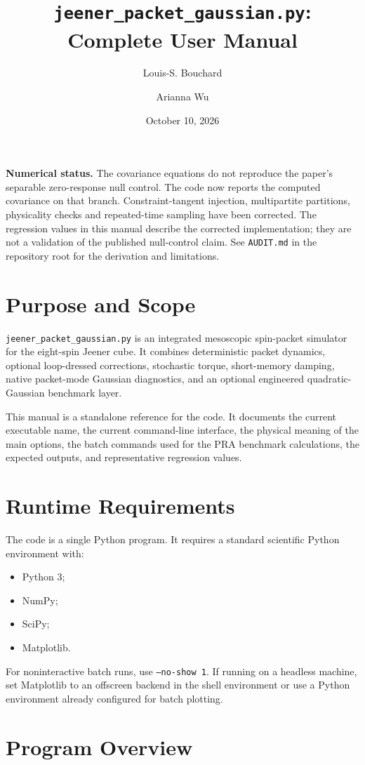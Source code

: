\documentclass[11pt]{article}
\title{\texttt{jeener\_packet\_gaussian.py}: Complete User Manual}
\author{Louis-S. Bouchard \and Arianna Wu}
\date{October 10, 2026}
\begin{document}
\maketitle
\noindent\textbf{Numerical status.} The covariance equations do not reproduce
the paper's separable zero-response null control. The code now reports the
computed covariance on that branch. Constraint-tangent injection, multipartite
partitions, physicality checks and repeated-time sampling have been corrected.
The regression values in this manual describe the corrected implementation;
they are not a validation of the published null-control claim. See
\texttt{AUDIT.md} in the repository root for the derivation and limitations.
\tableofcontents

\section{Purpose and Scope}
\texttt{jeener\_packet\_gaussian.py} is an integrated mesoscopic spin-packet
simulator for the eight-spin Jeener cube. It combines deterministic packet
dynamics, optional loop-dressed corrections, stochastic torque, short-memory
damping, native packet-mode Gaussian diagnostics, and an optional
engineered quadratic-Gaussian benchmark layer.

This manual is a standalone reference for the code. It documents the
current executable name, the current command-line interface, the physical
meaning of the main options, the batch commands used for the PRA benchmark
calculations, the expected outputs, and representative regression values.

\section{Runtime Requirements}
The code is a single Python program. It requires a standard scientific Python
environment with:
\begin{itemize}
\item Python 3;
\item NumPy;
\item SciPy;
\item Matplotlib.
\end{itemize}
For noninteractive batch runs, use \texttt{--no-show 1}. If running on a headless
machine, set Matplotlib to an offscreen backend in the shell environment or use a
Python environment already configured for batch plotting.

\section{Program Overview}
\end{document}
